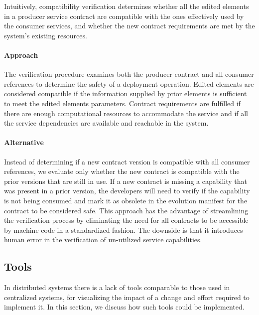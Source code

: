 Intuitively, compatibility verification determines whether
all the edited elements in a producer service contract are compatible with the ones effectively
used by the consumer services, and whether the new contract requirements are met
by the system’s existing resources.

\paragraph{Approach}
The verification procedure examines both the producer contract and all consumer references to determine the safety of a deployment operation.
Edited elements are considered compatible if the information supplied by prior elements is sufficient to meet the edited elements parameters.
Contract requirements are fulfilled if there are enough computational resources to accommodate the service and if all the
service dependencies are available and reachable in the system.

\paragraph{Alternative}
Instead of determining if a new contract version is compatible with all consumer references,
we evaluate only whether the new contract is compatible with the prior versions that are still in use.
If a new contract is missing a capability that was present in a prior version,
the developers will need to verify if the capability is not being consumed
and mark it as obsolete in the evolution manifest for the contract to be considered safe.
This approach has the advantage of streamlining the verification process by eliminating the
need for all contracts to be accessible by machine code in a standardized fashion.
The downside is that it introduces human error in the verification of un-utilized service capabilities.

\subsection{Tools} %
\label{sec:tools}

In distributed systems there is a lack of tools
comparable to those used in centralized systems, for visualizing the impact of a change and effort required to implement it.
In this section, we discuss how such tools could be implemented.

